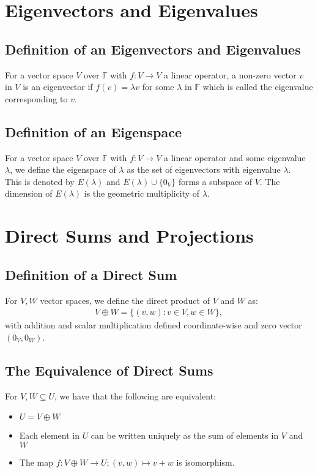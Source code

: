 \documentclass[a4paper, 12pt, twoside]{article}
\begin{document}
\section{Eigenvectors and Eigenvalues}

\subsection{Definition of an Eigenvectors and Eigenvalues}

For a vector space $V$ over $\mathbb{F}$ with $f: V \to V$ a 
linear operator, a non-zero vector $v$ in $V$ is an eigenvector
if $f(v) = \lambda v$ for some $\lambda$ in $\mathbb{F}$ which is
called the eigenvalue corresponding to $v$.

\subsection{Definition of an Eigenspace}

For a vector space $V$ over $\mathbb{F}$ with $f: V \to V$ a 
linear operator and some eigenvalue $\lambda$, we define the
eigenspace of $\lambda$ as the set of eigenvectors with eigenvalue
$\lambda$.
\\[\baselineskip]
This is denoted by $E(\lambda)$ and $E(\lambda)\cup\{0_{V}\}$ forms
a subspace of $V$. The dimension of $E(\lambda)$ is the geometric
multiplicity of $\lambda$.

\section{Direct Sums and Projections}

\subsection{Definition of a Direct Sum}

For $V, W$ vector spaces, we define the direct product of $V$ and
$W$ as: \begin{gather*}
  V \oplus W = \{(v, w) : v \in V, w \in W\},
\end{gather*} with addition and scalar multiplication defined
coordinate-wise and zero vector $(0_V, 0_W)$.

\subsection{The Equivalence of Direct Sums}
For $V, W \subseteq U$, we have that the following are equivalent:
\begin{itemize}
  \item $U = V \oplus W$
  \item Each element in $U$ can be written uniquely as the sum
  of elements in $V$ and $W$
  \item The map $f : V \oplus W \to U; (v, w) \mapsto v + w$ is
  isomorphism.
\end{itemize}
\end{document}
